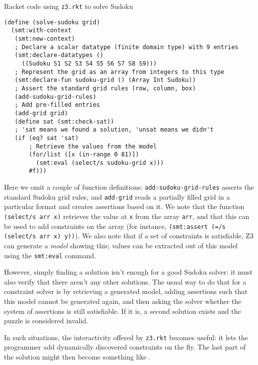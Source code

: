 \begin{program}
\caption{Racket code using \texttt{z3.rkt} to solve Sudoku}
\label{fig:sudoku}
\begin{verbatim}
(define (solve-sudoku grid)
  (smt:with-context
   (smt:new-context)
   ; Declare a scalar datatype (finite domain type) with 9 entries
   (smt:declare-datatypes ()
     ((Sudoku S1 S2 S3 S4 S5 S6 S7 S8 S9)))
   ; Represent the grid as an array from integers to this type
   (smt:declare-fun sudoku-grid () (Array Int Sudoku))
   ; Assert the standard grid rules (row, column, box)
   (add-sudoku-grid-rules)
   ; Add pre-filled entries
   (add-grid grid)
   (define sat (smt:check-sat))
   ; 'sat means we found a solution, 'unsat means we didn't
   (if (eq? sat 'sat)
       ; Retrieve the values from the model
       (for/list ([x (in-range 0 81)])
         (smt:eval (select/s sudoku-grid x)))
       #f)))
\end{verbatim}
\end{program}

Here we omit a couple of function definitions: \texttt{add-sudoku-grid-rules}
asserts the standard Sudoku grid rules, and \texttt{add-grid} reads a
partially filled grid in a particular format and creates assertions based on
it. We note that the function \texttt{(select/s arr x)} retrieves the value at
\texttt{x} from the array \texttt{arr}, and that this can be used to add
constraints on the array (for instance, \texttt{(smt:assert (=/s (select/s arr
x) y))}). We also note that if a set of constraints is satisfiable, Z3 can
generate a \textit{model} showing this; values can be extracted out of this
model using the \texttt{smt:eval} command.

However, simply finding a solution isn't enough for a good Sudoku solver: it
must also verify that there aren't any other solutions. The usual way to do
that for a constraint solver is by retrieving a generated model, adding
assertions such that this model cannot be generated again, and then asking the
solver whether the system of assertions is still satisfiable. If it is, a
second solution exists and the puzzle is considered invalid.

In such situations, the interactivity offered by \texttt{z3.rkt} becomes
useful: it lets the programmer add dynamically discovered constraints on the
fly. The last part of the solution might then become something like
.

